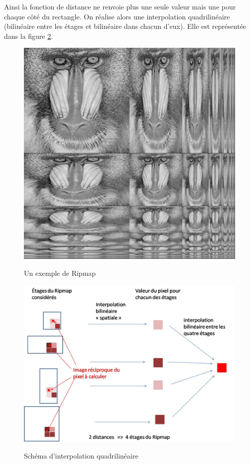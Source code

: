 Ainsi la fonction de distance ne renvoie plus une seule valeur mais une pour chaque côté du rectangle. On réalise alors une interpolation quadrilinéaire (bilinéaire entre les étages et bilinéaire dans chacun d'eux). Elle est représentée dans la figure \ref{interbibilineaire}.%



\begin{figure}[h!]
\centering
\caption{Un exemple de Ripmap}
\includegraphics[scale=0.4]{Ripmap_real}
\label{Ripmap_real}
\end{figure}


\begin{figure}[h!]
\centering
\caption{Schéma d'interpolation quadrilinéaire}
\includegraphics[scale=0.5]{interbibilineaire.jpg}
\label{interbibilineaire}
\end{figure}


